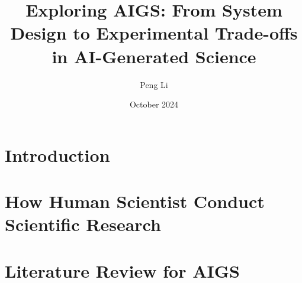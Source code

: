 \documentclass{article}
\title{Exploring AIGS: From System Design to Experimental Trade-offs in AI-Generated Science}
\author[1]{Peng Li}
\affil[1]{Institute for AI Industry Research (AIR), Tsinghua University}
\date{October 2024}
\begin{document}
\maketitle

\begin{abstract}


\end{abstract}


\section{Introduction}


\section{How Human Scientist Conduct Scientific Research}



\section{Literature Review for AIGS}


\end{document}
